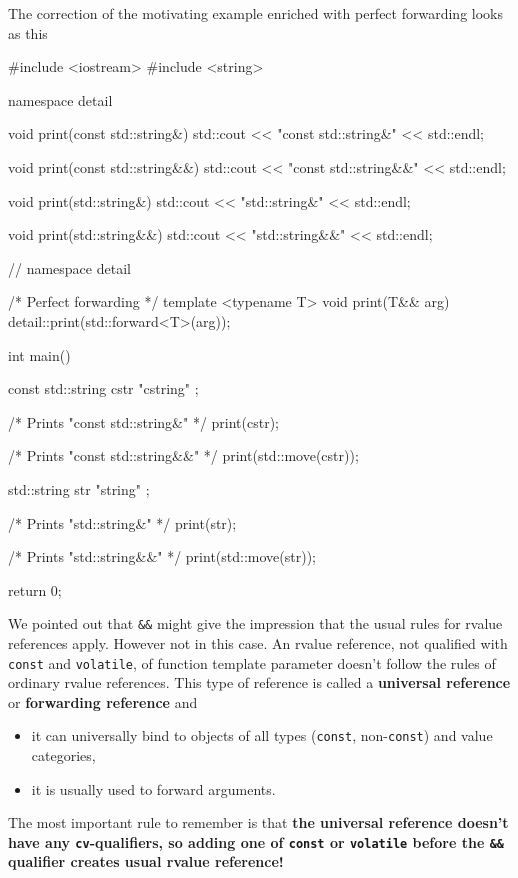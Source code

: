 \documentclass[../main]{subfiles}
\begin{document}
    The correction of the motivating example enriched with perfect forwarding looks as this
\begin{Code}
    #include <iostream>
    #include <string>

    namespace detail
    {
        void print(const std::string&)
        {
            std::cout << "const std::string&" << std::endl;
        }
        
        void print(const std::string&&)
        {
            std::cout << "const std::string&&" << std::endl;
        }
        
        void print(std::string&)
        {
            std::cout << "std::string&" << std::endl;
        }
        
        void print(std::string&&)
        {
            std::cout << "std::string&&" << std::endl;
        }
    }  // namespace detail

    /* Perfect forwarding */
    template <typename T>
    void print(T&& arg)
    {
        detail::print(std::forward<T>(arg));
    }
    
    int main()
    {
        const std::string cstr { "cstring" };

        /* Prints "const std::string&" */
        print(cstr);

        /* Prints "const std::string&&" */
        print(std::move(cstr));
    
        std::string str { "string" };
        
        /* Prints "std::string&" */
        print(str);

        /* Prints "std::string&&" */
        print(std::move(str));
    
        return 0;
    } 
\end{Code}

    We pointed out that \texttt{\&\&} might give the impression that the usual rules for rvalue references apply. However not in this case.
An rvalue reference, not qualified with \texttt{const} and \texttt{volatile}, of function template parameter doesn't follow the rules of ordinary rvalue references.
This type of reference is called a \textbf{universal reference} or \textbf{forwarding reference} and
\begin{itemize}
    \item it can universally bind to objects of all types (\texttt{const}, non-\texttt{const}) and value categories,
    \item it is usually used to forward arguments.
\end{itemize}
\noindent
    The most important rule to remember is that \textbf{the universal reference doesn't have any \texttt{cv}-qualifiers, so adding one of \texttt{const} or \texttt{volatile}
before the \texttt{\&\&} qualifier creates usual rvalue reference!}\newline
\end{document}

